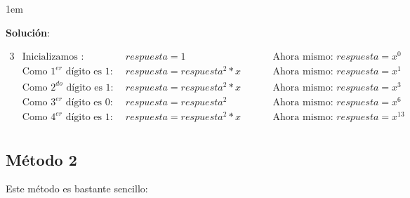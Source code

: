 \documentclass[12pt]{report}                                    %
\newenvironment{SmallIndentation}[1][0.75em]                    %
    {\begin{adjustwidth}{#1}{}\begin{footnotesize}}                 %
    {\end{footnotesize}\end{adjustwidth}}                           %
\DeclareMathOperator \Space {\quad}                             %
\begin{document}
            \begin{SmallIndentation}[1em]
                \textbf{Solución}:

                \begin{alignat*}{3}
                    &\text{Inicializamos : }                    
                        && respuesta = 1                        &&  \text{Ahora mismo: } respuesta = x^0  \\
                    &\text{Como $1^{er}$ dígito es 1:  } 
                        && respuesta = respuesta^2 * x          &&  \text{Ahora mismo: } respuesta = x^1  \\
                    &\text{Como $2^{do}$ dígito es 1:  }
                        && respuesta = respuesta^2 * x          &&  \text{Ahora mismo: } respuesta = x^3  \\
                    &\text{Como $3^{er}$ dígito es 0:  }
                        && respuesta = respuesta^2              &&  \text{Ahora mismo: } respuesta = x^6  \\
                    &\text{Como $4^{er}$ dígito es 1:  } \Space 
                        && respuesta = respuesta^2 * x   \Space &&  \text{Ahora mismo: } respuesta = x^{13} \\
                \end{alignat*}

            \end{SmallIndentation}

            


        \clearpage
        \subsection*{Método 2}

            Este método es bastante sencillo:
\end{document}
